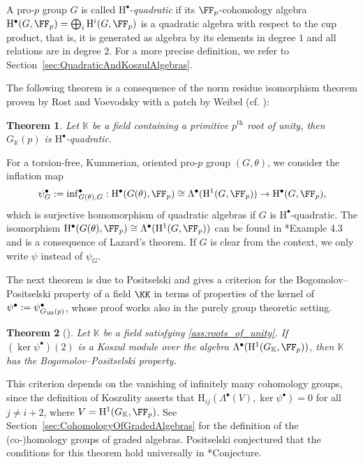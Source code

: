 \documentclass{amsart}
\newtheorem*{thm*}{Theorem}
\theoremstyle{definition}
\theoremstyle{remark}
\newcommand{\rmH}{\mathrm{H}}
\numberwithin{equation}{section}
\begin{document}
A pro-$p$ group $G$ is called $\rmH^\bullet$-\emph{quadratic} if its $\FF_p$-cohomology algebra $\rmH^\bullet(G,\FF_p)=\bigoplus_i \rmH^i(G,\FF_p)$ is a quadratic algebra with respect to the cup product, that is, it is generated as algebra by its elements in degree $1$ and all relations are in degree $2$. For a more precise definition, we refer to Section~\ref{sec:QuadraticAndKoszulAlgebras}.

The following theorem is a consequence of the norm residue isomorphism theorem proven by Rost and Voevodsky with a patch by Weibel (cf.  \cites{Voevodsky2011,Weibel2008,Weibel2009}):
\begin{thm*}
    \label{thm:NormResidueIso}
    Let $\mathbb{K}$ be a field containing a primitive $p^{\text{th}}$ root of unity, then $G_\mathbb{K}(p)$ is $\rmH^\bullet$-quadratic. %
\end{thm*}

For a torsion-free, Kummerian, oriented pro-$p$ group $(G,\theta)$, we consider the inflation map
\begin{align}
    \psi_G^\bullet:={\inf}_{G(\theta),G}^\bullet:\rmH^\bullet(G(\theta),\FF_p)\cong \Lambda^\bullet(\rmH^1(G,\FF_p))\to \rmH^\bullet(G,\FF_p),
\end{align}
which is surjective homomorphism of quadratic algebras if $G$ is $\rmH^\bullet$-quadratic. The isomorphism $\rmH^\bullet(G(\theta),\FF_p)\cong \Lambda^\bullet(\rmH^1(G,\FF_p))$ can be found in \cite{QuadrelliWeigel2022}*{Example 4.3} and is a consequence of Lazard's theorem. If $G$ is clear from the context, we only write $\psi$ instead of $\psi_G$.

The next theorem is due to Positselski and gives a criterion for the Bogomolov--Positselski property of a field $\KK$ in terms of properties of the kernel of $\psi^\bullet:=\psi_{G_\KK(p)}^\bullet$, whose proof works also in the purely group theoretic setting. 
\begin{thm*}[{\cite[Theorem 2]{Positselski2005}}]
\label{thm:Positelski_Koszul}
    Let $\mathbb{K}$ be a field satisfying \ref{ass:roots_of_unity}. If $(\ker \psi^\bullet)(2)$ is a Koszul module over the algebra $\Lambda^\bullet(\rmH^1(G_\mathbb{K},\FF_p))$, then $\mathbb{K}$ has the Bogomolov--Positselski property.
\end{thm*}
This criterion depends on the vanishing of infinitely many cohomology groups, since the definition of Koszulity asserts that $\rmH_{ij}(\Lambda^\bullet(V),\ker \psi^\bullet)=0$ for all $j\neq i+2$, where $V=\rmH^1(G_\mathbb{K},\FF_p)$. See Section~\ref{sec:CohomologyOfGradedAlgebras} for the definition of the (co-)homology groups of graded algebras. Positselski conjectured that the conditions for this theorem hold universally in \cite{Positselski2014}*{Conjecture}.
\end{document}
